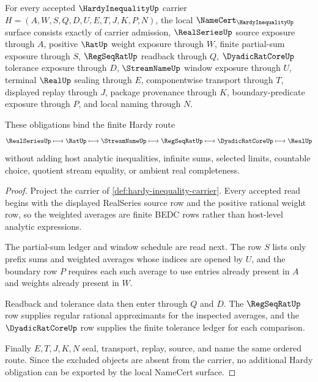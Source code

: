 \begin{theorem}
\label{thm:hardy-inequality-namecert-obligations}
For every accepted $\HardyInequalityUp$ carrier $H=(A,W,S,Q,D,U,E,T,J,K,P,N)$, the local $\NameCert_{\HardyInequalityUp}$ surface consists exactly of carrier admission, $\RealSeriesUp$ source exposure through $A$, positive $\RatUp$ weight exposure through $W$, finite partial-sum exposure through $S$, $\RegSeqRatUp$ readback through $Q$, $\DyadicRatCoreUp$ tolerance exposure through $D$, $\StreamNameUp$ window exposure through $U$, terminal $\RealUp$ sealing through $E$, componentwise transport through $T$, displayed replay through $J$, package provenance through $K$, boundary-predicate exposure through $P$, and local naming through $N$.

These obligations bind the finite Hardy route
$$
\RealSeriesUp \longmapsto \RatUp \longmapsto \StreamNameUp \longmapsto \RegSeqRatUp \longmapsto \DyadicRatCoreUp \longmapsto \RealUp
$$
without adding host analytic inequalities, infinite sums, selected limits, countable choice, quotient stream equality, or ambient real completeness.
\end{theorem}
\begin{proof}
Project the carrier of \autoref{def:hardy-inequality-carrier}. Every accepted read begins with the displayed RealSeries source row and the positive rational weight row, so the weighted averages are finite BEDC rows rather than host-level analytic expressions.

The partial-sum ledger and window schedule are read next. The row $S$ lists only prefix sums and weighted averages whose indices are opened by $U$, and the boundary row $P$ requires each such average to use entries already present in $A$ and weights already present in $W$.

Readback and tolerance data then enter through $Q$ and $D$. The $\RegSeqRatUp$ row supplies regular rational approximants for the inspected averages, and the $\DyadicRatCoreUp$ row supplies the finite tolerance ledger for each comparison.

Finally $E,T,J,K,N$ seal, transport, replay, source, and name the same ordered route. Since the excluded objects are absent from the carrier, no additional Hardy obligation can be exported by the local NameCert surface.
\end{proof}

